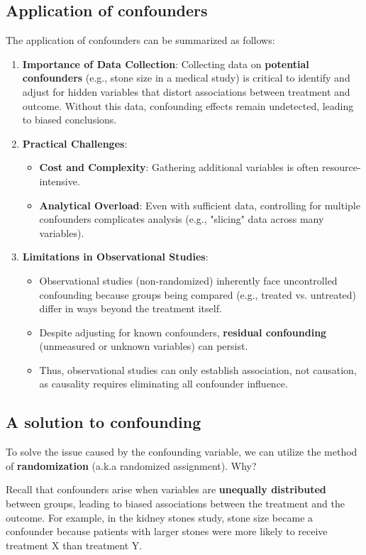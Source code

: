 \documentclass[math,code]{amznotes}
\theoremstyle{remark}
\begin{document}
\subsection{Application of confounders}
The application of confounders can be summarized as follows:
\begin{enumerate}
    \item \textbf{Importance of Data Collection}: Collecting data on \textbf{potential confounders} (e.g., stone size in a medical study) is critical to identify and adjust for hidden variables that distort associations between treatment and outcome. Without this data, confounding effects remain undetected, leading to biased conclusions.
    \item \textbf{Practical Challenges}:
    \begin{itemize}
        \item \textbf{Cost and Complexity}: Gathering additional variables is often resource-intensive.
        \item \textbf{Analytical Overload}: Even with sufficient data, controlling for multiple confounders complicates analysis (e.g., "slicing" data across many variables).
    \end{itemize}
    \item \textbf{Limitations in Observational Studies}: 
    \begin{itemize}
        \item Observational studies (non-randomized) inherently face uncontrolled confounding because groups being compared (e.g., treated vs. untreated) differ in ways beyond the treatment itself.
        \item Despite adjusting for known confounders, \textbf{residual confounding} (unmeasured or unknown variables) can persist.
        \item Thus, observational studies can only establish association, not causation, as causality requires eliminating all confounder influence.
    \end{itemize}
\end{enumerate}

\subsection{A solution to confounding}
To solve the issue caused by the confounding variable, we can utilize the method of \textbf{randomization} (a.k.a randomized assignment). Why?

Recall that confounders arise when variables are \textbf{unequally distributed} between groups, leading to biased associations between the treatment and the outcome. For example, in the kidney stones study, stone size became a confounder because patients with larger stones were more likely to receive treatment X than treatment Y.
\end{document}
